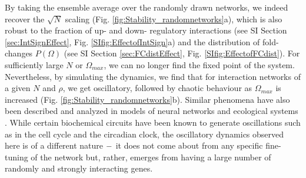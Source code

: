 \documentclass[10pt]{article}
\begin{document}
By taking the ensemble average over the randomly drawn networks, we indeed recover the $\sqrt{N}$ scaling (Fig. \ref{fig:Stability_randomnetworks}a), which is also robust to the fraction of up- and down- regulatory interactions (see SI Section \ref{sec:IntSignEffect}, Fig. \ref{SIfig:EffectofIntSign}a) and the distribution of fold-changes $P(\Omega)$ (see SI Section \ref{sec:FCdistEffect}, Fig. \ref{SIfig:EffectofFCdist}). For sufficiently large $N$ or $\Omega_{max}$, we can no longer find the fixed point of the system. Nevertheless, by simulating the dynamics, we find that for interaction networks of a given $N$ and $\rho$, we get oscillatory, followed by chaotic behaviour as $\Omega_{max}$ is increased (Fig. \ref{fig:Stability_randomnetworks}b). Similar phenomena have also been described and analyzed in models of neural networks \cite{sompolinsky1988chaos} and ecological systems \cite{roy2019numerical}. While certain biochemical circuits have been known to generate oscillations such as in the cell cycle and the circadian clock, the oscillatory dynamics observed here is of a different nature $\--$ it does not come about from any specific fine-tuning of the network but, rather, emerges from having a large number of randomly and strongly interacting genes. 
\end{document}
